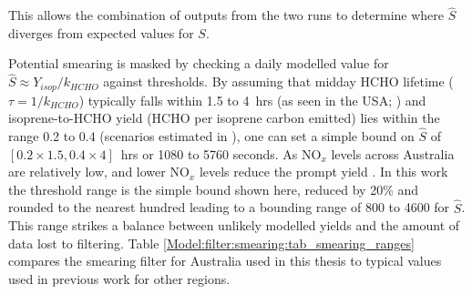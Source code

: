       This allows the combination of outputs from the two runs to determine where $\hat{S}$ diverges from expected values for $S$.
      
      Potential smearing is masked by checking a daily modelled value for $\hat{S} \approx Y_{isop}/k_{HCHO}$ against thresholds.
      By assuming that midday HCHO lifetime ($\tau = 1/k_{HCHO}$) typically falls within 1.5 to 4~hrs (as seen in the USA; \textcite[e.g.,][]{Palmer2006,Wolfe2016}) and isoprene-to-HCHO yield (HCHO per isoprene carbon emitted) lies within the range 0.2 to 0.4 (scenarios estimated in \textcite{Palmer2003}), one can set a simple bound on $\hat{S}$ of $[0.2 \times 1.5, 0.4 \times 4]$~hrs or 1080 to 5760 seconds.
      As NO$_x$ levels across Australia are relatively low, and lower NO$_x$ levels reduce the prompt yield \parencite{Palmer2003,Wolfe2016}.
      In this work the threshold range is the simple bound shown here, reduced by 20\% and rounded to the nearest hundred leading to a bounding range of 800 to 4600 for $\hat{S}$. 
      This range strikes a balance between unlikely modelled yields and the amount of data lost to filtering.
      Table \ref{Model:filter:smearing:tab_smearing_ranges} compares the smearing filter for Australia used in this thesis to typical values used in previous work for other regions.
      
